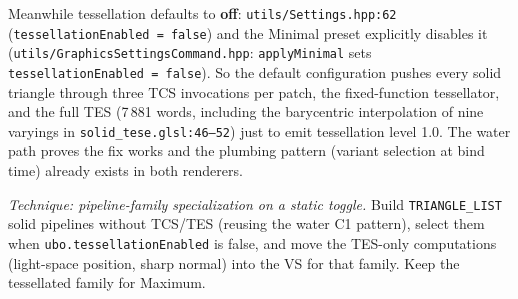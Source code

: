 \documentclass[11pt,a4paper]{article}
\begin{document}
Meanwhile tessellation defaults to \textbf{off}:
\texttt{utils/Settings.hpp:62} (\texttt{tessellationEnabled = false}) and the
Minimal preset explicitly disables it
(\texttt{utils/GraphicsSettingsCommand.hpp}: \texttt{applyMinimal} sets
\texttt{tessellationEnabled = false}). So the default configuration pushes
every solid triangle through three TCS invocations per patch, the
fixed-function tessellator, and the full TES (7\,881 words, including the
barycentric interpolation of nine varyings in
\texttt{solid\_tese.glsl:46--52}) just to emit tessellation level 1.0. The
water path proves the fix works and the plumbing pattern (variant selection at
bind time) already exists in both renderers.

\textit{Technique: pipeline-family specialization on a static toggle.}
Build \texttt{TRIANGLE\_LIST} solid pipelines without TCS/TES (reusing the
water C1 pattern), select them when \texttt{ubo.tessellationEnabled} is false,
and move the TES-only computations (light-space position, sharp normal) into
the VS for that family. Keep the tessellated family for Maximum.
\end{document}
